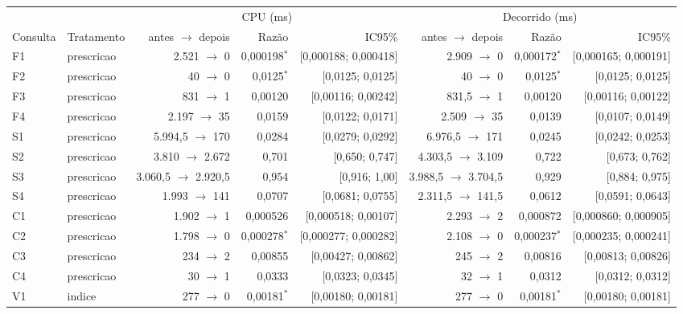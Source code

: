 {\footnotesize\setlength{\tabcolsep}{4pt}
\begin{tabular}{llrrrrrr}
\toprule
 &  & \multicolumn{3}{c}{CPU (ms)} & \multicolumn{3}{c}{Decorrido (ms)} \\
\cmidrule(lr){3-5}\cmidrule(lr){6-8}
Consulta & Tratamento & antes $\to$ depois & Razão & IC95\% & antes $\to$ depois & Razão & IC95\% \\
\midrule
F1 & prescricao & 2.521 $\to$ 0 & 0,000198$^{*}$ & [0,000188; 0,000418] & 2.909 $\to$ 0 & 0,000172$^{*}$ & [0,000165; 0,000191] \\
F2 & prescricao & 40 $\to$ 0 & 0,0125$^{*}$ & [0,0125; 0,0125] & 40 $\to$ 0 & 0,0125$^{*}$ & [0,0125; 0,0125] \\
F3 & prescricao & 831 $\to$ 1 & 0,00120 & [0,00116; 0,00242] & 831,5 $\to$ 1 & 0,00120 & [0,00116; 0,00122] \\
F4 & prescricao & 2.197 $\to$ 35 & 0,0159 & [0,0122; 0,0171] & 2.509 $\to$ 35 & 0,0139 & [0,0107; 0,0149] \\
S1 & prescricao & 5.994,5 $\to$ 170 & 0,0284 & [0,0279; 0,0292] & 6.976,5 $\to$ 171 & 0,0245 & [0,0242; 0,0253] \\
S2 & prescricao & 3.810 $\to$ 2.672 & 0,701 & [0,650; 0,747] & 4.303,5 $\to$ 3.109 & 0,722 & [0,673; 0,762] \\
S3 & prescricao & 3.060,5 $\to$ 2.920,5 & 0,954 & [0,916; 1,00] & 3.988,5 $\to$ 3.704,5 & 0,929 & [0,884; 0,975] \\
S4 & prescricao & 1.993 $\to$ 141 & 0,0707 & [0,0681; 0,0755] & 2.311,5 $\to$ 141,5 & 0,0612 & [0,0591; 0,0643] \\
C1 & prescricao & 1.902 $\to$ 1 & 0,000526 & [0,000518; 0,00107] & 2.293 $\to$ 2 & 0,000872 & [0,000860; 0,000905] \\
C2 & prescricao & 1.798 $\to$ 0 & 0,000278$^{*}$ & [0,000277; 0,000282] & 2.108 $\to$ 0 & 0,000237$^{*}$ & [0,000235; 0,000241] \\
C3 & prescricao & 234 $\to$ 2 & 0,00855 & [0,00427; 0,00862] & 245 $\to$ 2 & 0,00816 & [0,00813; 0,00826] \\
C4 & prescricao & 30 $\to$ 1 & 0,0333 & [0,0323; 0,0345] & 32 $\to$ 1 & 0,0312 & [0,0312; 0,0312] \\
V1 & indice & 277 $\to$ 0 & 0,00181$^{*}$ & [0,00180; 0,00181] & 277 $\to$ 0 & 0,00181$^{*}$ & [0,00180; 0,00181] \\

\end{tabular}}
